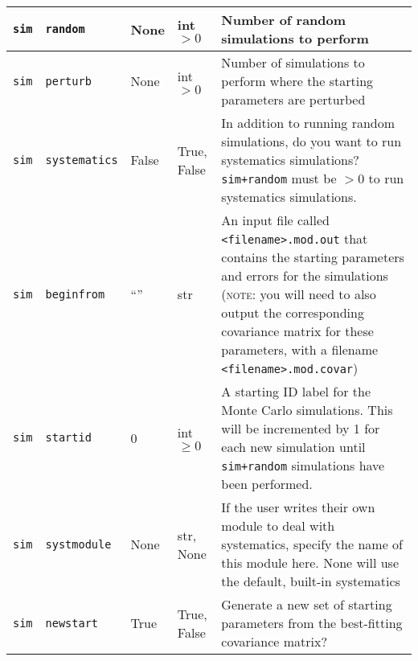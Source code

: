 \begin{center}
\begin{longtable}{p{1.5cm}p{2.5cm}p{2.0cm}p{2.0cm}p{5.0cm}}
\multicolumn{1}{p{1.5cm}}{\texttt{sim}} &
\multicolumn{1}{p{2.5cm}}{\texttt{random}} &
\multicolumn{1}{p{2.0cm}}{None} &
\multicolumn{1}{p{2.0cm}}{int $> 0$} &
\multicolumn{1}{p{5.0cm}}{Number of random simulations to perform} \\ \midrule

\multicolumn{1}{p{1.5cm}}{\texttt{sim}} &
\multicolumn{1}{p{2.5cm}}{\texttt{perturb}} &
\multicolumn{1}{p{2.0cm}}{None} &
\multicolumn{1}{p{2.0cm}}{int $> 0$} &
\multicolumn{1}{p{5.0cm}}{Number of simulations to perform where the starting parameters are perturbed} \\ \midrule

\multicolumn{1}{p{1.5cm}}{\texttt{sim}} &
\multicolumn{1}{p{2.5cm}}{\texttt{systematics}} &
\multicolumn{1}{p{2.0cm}}{False} &
\multicolumn{1}{p{2.0cm}}{True, False} &
\multicolumn{1}{p{5.0cm}}{In addition to running random simulations, do you want to run systematics simulations? \texttt{sim+random} must be $> 0$ to run systematics simulations.} \\ \midrule

\multicolumn{1}{p{1.5cm}}{\texttt{sim}} &
\multicolumn{1}{p{2.5cm}}{\texttt{beginfrom}} &
\multicolumn{1}{p{2.0cm}}{``''} &
\multicolumn{1}{p{2.0cm}}{str} &
\multicolumn{1}{p{5.0cm}}{An input file called \texttt{<filename>.mod.out} that contains the starting parameters and errors for the simulations (\textsc{note}: you will need to also output the corresponding covariance matrix for these parameters, with a filename \texttt{<filename>.mod.covar})} \\ \midrule

\multicolumn{1}{p{1.5cm}}{\texttt{sim}} &
\multicolumn{1}{p{2.5cm}}{\texttt{startid}} &
\multicolumn{1}{p{2.0cm}}{0} &
\multicolumn{1}{p{2.0cm}}{int $\ge 0$} &
\multicolumn{1}{p{5.0cm}}{A starting ID label for the Monte Carlo simulations. This will be incremented by 1 for each new simulation until \texttt{sim+random} simulations have been performed.} \\ \midrule

\multicolumn{1}{p{1.5cm}}{\texttt{sim}} &
\multicolumn{1}{p{2.5cm}}{\texttt{systmodule}} &
\multicolumn{1}{p{2.0cm}}{None} &
\multicolumn{1}{p{2.0cm}}{str, None} &
\multicolumn{1}{p{5.0cm}}{If the user writes their own module to deal with systematics, specify the name of this module here. None will use the default, built-in systematics} \\ \midrule

\multicolumn{1}{p{1.5cm}}{\texttt{sim}} &
\multicolumn{1}{p{2.5cm}}{\texttt{newstart}} &
\multicolumn{1}{p{2.0cm}}{True} &
\multicolumn{1}{p{2.0cm}}{True, False} &
\multicolumn{1}{p{5.0cm}}{Generate a new set of starting parameters from the best-fitting covariance matrix?} \\ \midrule


\end{longtable}
\end{center}
